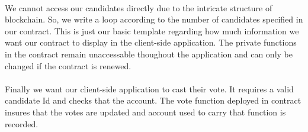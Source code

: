 \documentclass{article}
\begin{document}
\\
We cannot access our candidates directly due to the intricate structure of blockchain. So, we write a loop according to the number of candidates specified in our contract. This is just our basic template regarding how much information we want our contract to display in the client-side application. The private functions in the contract remain unaccessable thoughout the application and can only be changed if the contract is renewed. 
\\

\\
Finally we want our client-side application to cast their vote. It requires a valid candidate Id and checks that the account. The vote function deployed in contract insures that the votes are updated and account used to carry that function is recorded.
\end{document}
